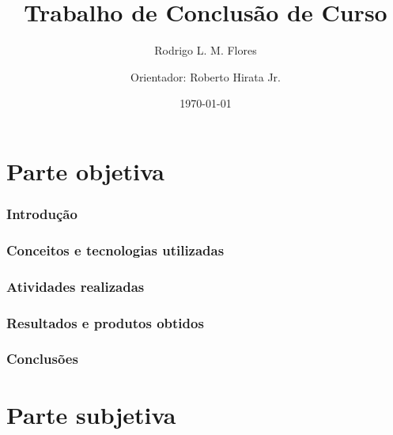 \documentclass[a4paper,12pt,titlepage]{article}
\title{Trabalho de Conclusão de Curso \\ }
\author{Rodrigo L. M. Flores \and
        Orientador: Roberto Hirata Jr. }
\date{\today}
\begin{document}
\maketitle

\tableofcontents

\nocite{wiki:volunteercomputing}
\nocite{wiki:interpretedlanguage}
\nocite{wiki:boinc}
\nocite{wiki:r}
\nocite{boinc_wrapper}
\nocite{hungaro}


\part{Parte objetiva}

\section{Introdução}



\newpage

\section{Conceitos e tecnologias utilizadas}



\newpage

\section{Atividades realizadas}



\newpage

\section{Resultados e produtos obtidos}




\newpage

\section{Conclusões}



\newpage





\newpage


\part{Parte subjetiva}


\end{document}
